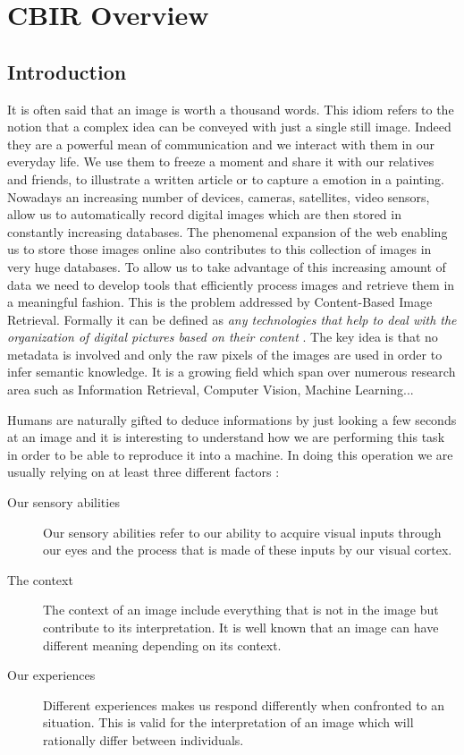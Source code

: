 \chapter{CBIR Overview}

  \section{Introduction}

    It is often said that an image is worth a thousand words. This idiom refers to the notion that a complex idea can be conveyed with just a single still image. Indeed they are a powerful mean of communication and we interact with them in our everyday life. We use them to freeze a moment and share it with our relatives and friends, to illustrate a written article or to capture a emotion in a painting. Nowadays an increasing number of devices, cameras, satellites, video sensors, allow us to automatically record digital images which are then stored in constantly increasing databases. The phenomenal expansion of the web enabling us to store those images online also contributes to this collection of images in very huge databases. To allow us to take advantage of this increasing amount of data we need to develop tools that efficiently process images and retrieve them in a meaningful fashion. This is the problem addressed by Content-Based Image Retrieval. Formally it can be defined as \textit{any technologies that help to deal with the organization of digital pictures based on their content} \cite{CBIR_Trends_NewAge}. The key idea is that no metadata is involved and only the raw pixels of the images are used in order to infer semantic knowledge. It is a growing field which span over numerous research area such as Information Retrieval, Computer Vision, Machine Learning...

    Humans are naturally gifted to deduce informations by just looking a few seconds at an image and it is interesting to understand how we are performing this task in order to be able to reproduce it into a machine. In doing this operation we are usually relying on at least three different factors :

    \begin{description}
      \item[Our sensory abilities] Our sensory abilities refer to our ability to acquire visual inputs through our eyes and the process that is made of these inputs by our visual cortex.

      \item[The context] The context of an image include everything that is not in the image but contribute to its interpretation. It is well known that an image can have different meaning depending on its context.

      \item[Our experiences] Different experiences makes us respond differently when confronted to an situation. This is valid for the interpretation of an image which will rationally differ between individuals.

    \end{description}

